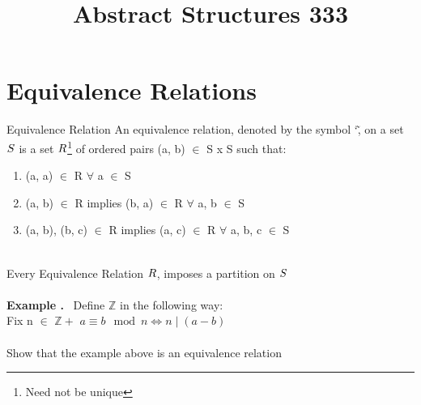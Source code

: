 \documentclass{article}
\title{Abstract Structures 333}
\newcounter{example}
\newcounter{solution}
\theoremstyle{claim}
\newcommand\Example{%
  \stepcounter{example}%
  \textbf{Example \theexample.}~%
  \setcounter{solution}{0}%
}
\begin{document}
\maketitle


\section{Equivalence Relations}
\begin{definition}{Equivalence Relation}
An equivalence relation, denoted by the symbol \char`\~ , on a set $\Huge S$ is a set $\Huge R$\footnote{Need not be unique}
of ordered pairs (a, b) $\in$ S x S such that:

\begin{enumerate}
  \item (a, a) $\in$ R $\forall$ a $\in$ S
  \item (a, b) $\in$ R implies (b, a) $\in$ R $\forall$ a, b $\in$ S
  \item (a, b), (b, c) $\in$ R implies (a, c) $\in$ R $\forall$ a, b, c $\in$ S
\end{enumerate}
\end{definition}\\
Every Equivalence Relation $\Huge R$, imposes a partition on $\Huge S$\\\\
\Example Define $\mathbb{Z}$ in the following way:\\
Fix n $\in$ $\mathbb{Z+}$ 
$a \equiv b \mod n \iff n \mid (a-b)$\\\\
Show that the example above is an equivalence relation
\end{document}
